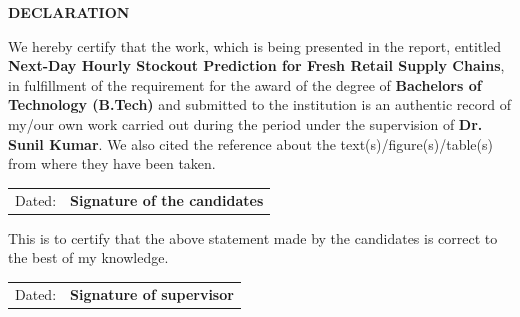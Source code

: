 
\begin{center}
{\Large \bf DECLARATION}
\end{center}
\vspace{0.5cm}
\noindent We hereby certify that the work, which is being presented in the report, entitled \textbf{Next-Day Hourly Stockout Prediction for Fresh Retail Supply Chains}, in fulfillment of the requirement for the award of the degree of \textbf{Bachelors of Technology (B.Tech)} and submitted to the institution is an authentic record of my/our own work carried out during the period under the supervision of \textbf{Dr. Sunil Kumar}. We also cited the reference about the text(s)/figure(s)/table(s) from where they have been taken.

\vspace{1cm}

\begin{center}
	\begin{tabular}{p{}p{}}
		Dated:  & {\bf{Signature of the candidates}} \\	
	\end{tabular}
\end{center}
\vspace{1.5cm}
\noindent This is to certify that the above statement made by the candidates is correct to the best of my knowledge.

\vspace{1.5cm}

\begin{center}
	\begin{tabular}{p{}p{}}
		Dated: & {\bf{Signature of supervisor}} \\	
	\end{tabular}
\end{center}


%
%
%
